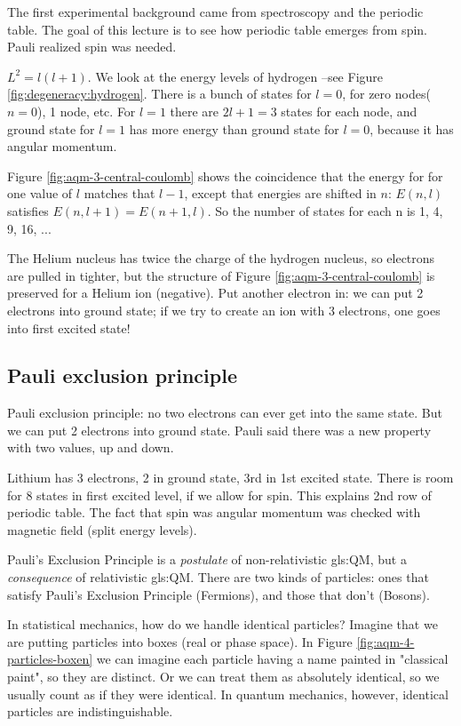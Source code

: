 \documentclass[]{article}
\begin{document}
The first experimental background came from spectroscopy and the periodic table. The goal of this lecture is to see how periodic table emerges from spin. Pauli realized spin was needed.

$L^2=l(l+1)$. We look at the energy levels of hydrogen --see Figure \ref{fig:degeneracy:hydrogen}. There is a bunch of states for $l=0$, for zero nodes($n=0$), 1 node, etc. For $l=1$ there are $2l+1=3$ states for each node, and ground state for $l=1$ has more energy than ground state for $l=0$, because it has angular momentum.

Figure \ref{fig:aqm-3-central-coulomb} shows the coincidence that the  energy for  for one value of $l$ matches that $l-1$, except that energies are shifted in $n$: $E(n,l)$ satisfies $E(n,l+1)=E(n+1,l)$. So the number of states for each n is 1, 4, 9, 16, ...

The Helium nucleus has twice the charge of the hydrogen nucleus, so electrons are pulled in tighter, but the structure of Figure \ref{fig:aqm-3-central-coulomb}  is preserved for a Helium ion (negative). Put another electron in: we can put 2 electrons into ground state; if we try to create an ion with 3 electrons, one goes into first excited state! 

\subsection{Pauli exclusion principle}

Pauli exclusion principle: no two electrons can ever get into the same state. But we can put 2 electrons into ground state. Pauli said there was a new property with two values, up and down.

Lithium has 3 electrons, 2 in ground state, 3rd in 1st excited state. There is room for 8 states in first excited level, if we allow for spin. This explains 2nd row of periodic table. The fact that spin was angular momentum was checked with magnetic field (split energy levels).

Pauli's Exclusion Principle is a \emph{postulate} of non-relativistic \gls{gls:QM}, but a \emph{consequence} of relativistic \gls{gls:QM}. There are two kinds of particles: ones that satisfy Pauli's Exclusion Principle (Fermions), and those that don't (Bosons).

In statistical mechanics, how do we handle identical particles? Imagine that we are putting particles into boxes (real or phase space). In Figure \ref{fig:aqm-4-particles-boxen} we can imagine each particle having a name painted in "classical paint", so they are distinct. Or we can treat them as absolutely identical, so we usually count as if they were identical. In quantum mechanics, however, identical  particles are indistinguishable.
\end{document}
